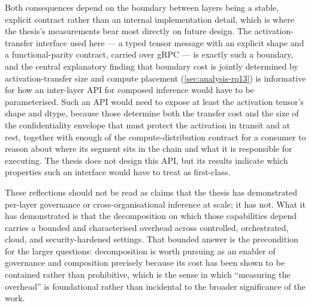 Both consequences depend on the boundary between layers being a stable, explicit
contract rather than an internal implementation detail, which is where the
thesis's measurements bear most directly on future design. The activation-transfer
interface used here --- a typed tensor message with an explicit shape and a
functional-parity contract, carried over gRPC --- is exactly such a boundary, and
the central explanatory finding that boundary cost is jointly determined by
activation-transfer size and compute placement (\cref{sec:analysis-rq13}) is
informative for how an inter-layer API for composed inference would have to be
parameterised. Such an API would need to expose at least the activation tensor's
shape and dtype, because those determine both the transfer cost and the size of
the confidentiality envelope that must protect the activation in transit and at
rest, together with enough of the compute-distribution contract for a consumer to
reason about where its segment sits in the chain and what it is responsible for
executing. The thesis does not design this API, but its results indicate which
properties such an interface would have to treat as first-class.

These reflections should not be read as claims that the thesis has demonstrated
per-layer governance or cross-organisational inference at scale; it has not. What
it has demonstrated is that the decomposition on which those capabilities depend
carries a bounded and characterised overhead across controlled, orchestrated,
cloud, and security-hardened settings. That bounded answer is the precondition
for the larger questions: decomposition is worth pursuing as an enabler of
governance and composition precisely because its cost has been shown to be
contained rather than prohibitive, which is the sense in which ``measuring the
overhead'' is foundational rather than incidental to the broader significance of
the work.
